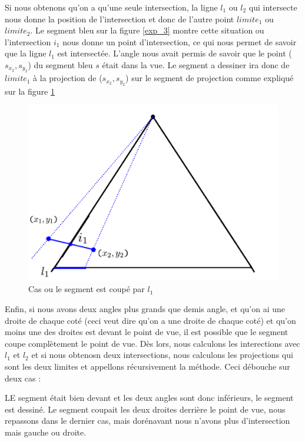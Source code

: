 \documentclass[11pt,a4paper]{article}
\begin{document}
Si nous obtenons qu'on a qu'une seule intersection, la ligne $l_1$ ou $l_2$ qui intersecte nous donne la position de l'intersection et donc de l'autre point $limite_1$ ou $limite_2$. Le segment bleu sur la figure \ref{exp_3} montre cette situation ou l'intersection $i_1$ nous donne un point d'intersection, ce qui nous permet de savoir que la ligne $l_1$ est intersectée. L'angle nous avait permis de savoir que le point ($s_{x_2},s_{y_2}$) du segment bleu $s$ était dans la vue. Le segment a dessiner ira donc de $limite_1$ à la projection de ($s_{x_2},s_{y_2}$) sur le segment de projection comme expliqué sur la figure \ref{cas2}

\begin{figure}[H]
\centering
\includegraphics[scale=0.6]{cas2.png}
\caption{Cas ou le segment est coupé par $l_1$}
\label{cas2}
\end{figure}

Enfin, si nous avons deux angles plus grands que demis angle, et qu'on ai une droite de chaque coté (ceci veut dire qu'on a une droite de chaque coté) et qu'on moins une des droites est devant le point de vue, il est possible que le segment coupe complètement le point de vue. Dès lors, nous calculons les interections avec $l_1$ et $l_2$ et si nous obtenosn deux intersections, nous calculons les projections qui sont les deux limites et appellons récursivement la méthode. Ceci débouche sur deux cas :

LE segment était bien devant et les deux angles sont donc inférieurs, le segment est dessiné.
Le segment coupait les deux droites derrière le point de vue, nous repassons dans le dernier cas, mais dorénavant nous n'avons plus d'intersection mais gauche ou droite.
\end{document}
